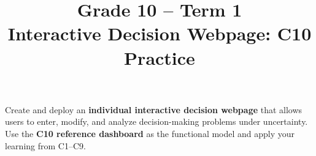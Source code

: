 \makeatletter
{}
\makeatother




\linespread{1.0}
\setlength{\parskip}{4pt}

\title{Grade 10 -- Term 1\\Interactive Decision Webpage: C10 Practice}
\author{}
\date{}


	\maketitle
{}

	
	Create and deploy an \textbf{individual interactive decision webpage} that allows users to enter, modify, and analyze decision-making problems under uncertainty. Use the \textbf{C10 reference dashboard} as the functional model and apply your learning from C1--C9.
	

